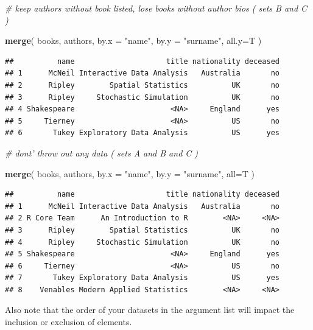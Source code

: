 \documentclass[]{book}
\newenvironment{Shaded}{\begin{snugshade}}{\end{snugshade}}
\newcommand{\CommentTok}[1]{\textcolor[rgb]{0.56,0.35,0.01}{\textit{#1}}}
\newcommand{\DataTypeTok}[1]{\textcolor[rgb]{0.13,0.29,0.53}{#1}}
\newcommand{\KeywordTok}[1]{\textcolor[rgb]{0.13,0.29,0.53}{\textbf{#1}}}
\newcommand{\NormalTok}[1]{#1}
\newcommand{\StringTok}[1]{\textcolor[rgb]{0.31,0.60,0.02}{#1}}
\theoremstyle{definition}
\theoremstyle{definition}
\theoremstyle{definition}
\theoremstyle{remark}
\begin{document}
\begin{Shaded}
\begin{Highlighting}[]
\CommentTok{# keep authors without book listed, lose books without author bios   ( sets B and C )}

\KeywordTok{merge}\NormalTok{( books, authors, }\DataTypeTok{by.x =} \StringTok{"name"}\NormalTok{, }\DataTypeTok{by.y =} \StringTok{"surname"}\NormalTok{, }\DataTypeTok{all.y=}\NormalTok{T )    }
\end{Highlighting}
\end{Shaded}

\begin{verbatim}
##          name                     title nationality deceased
## 1      McNeil Interactive Data Analysis   Australia       no
## 2      Ripley        Spatial Statistics          UK       no
## 3      Ripley     Stochastic Simulation          UK       no
## 4 Shakespeare                      <NA>     England      yes
## 5     Tierney                      <NA>          US       no
## 6       Tukey Exploratory Data Analysis          US      yes
\end{verbatim}

\begin{Shaded}
\begin{Highlighting}[]
\CommentTok{# dont' throw out any data   ( sets A and B and C )}

\KeywordTok{merge}\NormalTok{( books, authors, }\DataTypeTok{by.x =} \StringTok{"name"}\NormalTok{, }\DataTypeTok{by.y =} \StringTok{"surname"}\NormalTok{, }\DataTypeTok{all=}\NormalTok{T )   }
\end{Highlighting}
\end{Shaded}

\begin{verbatim}
##          name                     title nationality deceased
## 1      McNeil Interactive Data Analysis   Australia       no
## 2 R Core Team      An Introduction to R        <NA>     <NA>
## 3      Ripley        Spatial Statistics          UK       no
## 4      Ripley     Stochastic Simulation          UK       no
## 5 Shakespeare                      <NA>     England      yes
## 6     Tierney                      <NA>          US       no
## 7       Tukey Exploratory Data Analysis          US      yes
## 8    Venables Modern Applied Statistics        <NA>     <NA>
\end{verbatim}

Also note that the order of your datasets in the argument list will
impact the inclusion or exclusion of elements.
\end{document}
